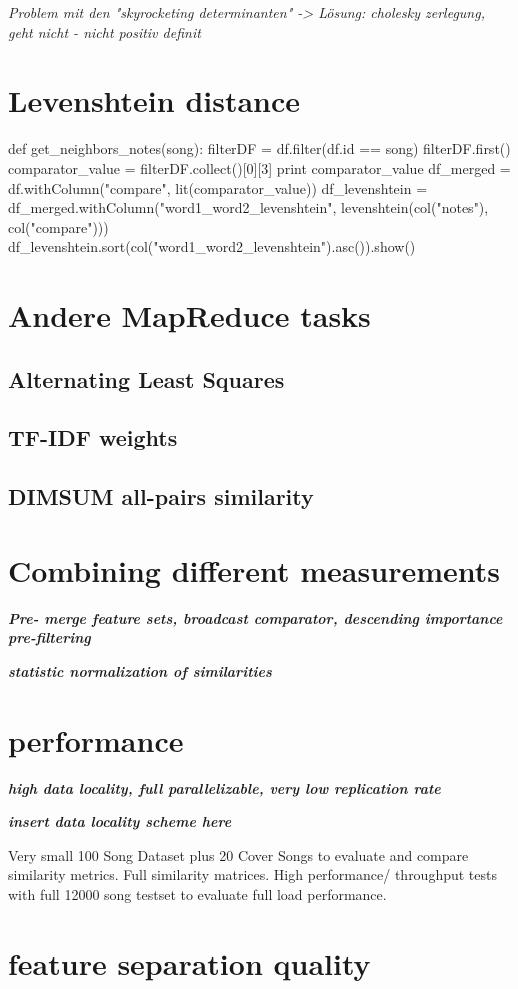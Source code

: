 \textit{Problem mit den "skyrocketing determinanten" -> Lösung: cholesky zerlegung, geht nicht - nicht positiv definit}\cite[p.45]{schnitzer1}

\section{Levenshtein distance}

\begin{pythonCode}
def get_neighbors_notes(song):
    filterDF = df.filter(df.id == song)
    filterDF.first()
    comparator_value = filterDF.collect()[0][3] 
    print comparator_value
    df_merged = df.withColumn("compare", lit(comparator_value))
    df_levenshtein = df_merged.withColumn("word1_word2_levenshtein", levenshtein(col("notes"), col("compare")))
    df_levenshtein.sort(col("word1_word2_levenshtein").asc()).show()
\end{pythonCode}

\section{Andere MapReduce tasks}

\subsection{Alternating Least Squares}

\subsection{TF-IDF weights}

\subsection{DIMSUM all-pairs similarity}

\section{Combining different measurements}

\textit{\textbf{Pre- merge feature sets, broadcast comparator, descending importance pre-filtering}}

\textit{\textbf{statistic normalization of similarities}}

\section{performance}

\textit{\textbf{high data locality, full parallelizable, very low replication rate}}

\textit{\textbf{insert data locality scheme here}}

Very small 100 Song Dataset plus 20 Cover Songs to evaluate and compare similarity metrics. Full similarity matrices. 
High performance/ throughput tests with full 12000 song testset to evaluate full load performance.\\


\section{feature separation quality}